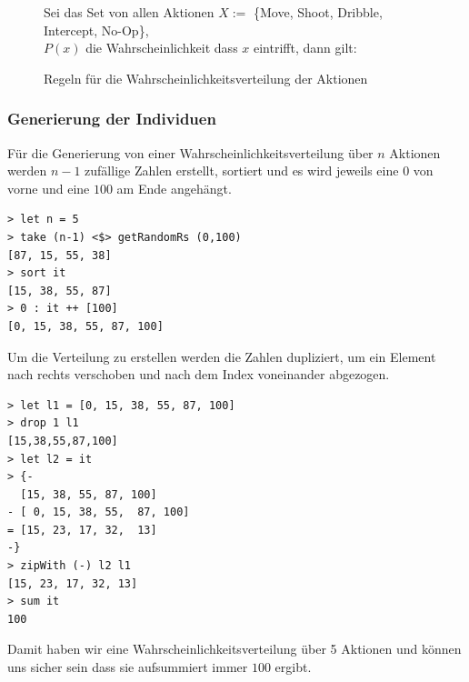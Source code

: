            \begin{figure}[H]
                \begin{mdframed}
                    Sei das Set von allen Aktionen $ X := $ \{Move, Shoot, Dribble, Intercept, No-Op\}, \\
                    $P(x)$ die Wahrscheinlichkeit dass $x$ eintrifft, dann gilt: \\[2mm]
                    \hspace*{25mm} 
                \end{mdframed}
                \renewcommand{\figurename}{Lemma}
                \caption{\label{kodierung} Regeln für die Wahrscheinlichkeitsverteilung der Aktionen}
            \end{figure}

            \subsubsection*{Generierung der Individuen}
            Für die Generierung von einer Wahrscheinlichkeitsverteilung über $n$ Aktionen werden $n-1$ zufällige Zahlen erstellt, sortiert und es wird jeweils eine $0$ von vorne und eine $100$ am Ende angehängt.

            \begin{mdframed}
            \begin{verbatim}
> let n = 5
> take (n-1) <$> getRandomRs (0,100)
[87, 15, 55, 38]
> sort it
[15, 38, 55, 87]
> 0 : it ++ [100]
[0, 15, 38, 55, 87, 100]
            \end{verbatim}
            \end{mdframed}
            \noindent
            Um die Verteilung zu erstellen werden die Zahlen dupliziert, um ein Element nach rechts verschoben und nach dem Index voneinander abgezogen.
            \begin{mdframed}
            \begin{verbatim}
> let l1 = [0, 15, 38, 55, 87, 100]
> drop 1 l1
[15,38,55,87,100]
> let l2 = it
> {-
  [15, 38, 55, 87, 100]
- [ 0, 15, 38, 55,  87, 100]
= [15, 23, 17, 32,  13]
-}
> zipWith (-) l2 l1
[15, 23, 17, 32, 13]
> sum it
100
            \end{verbatim}
            \end{mdframed}
            \noindent
            Damit haben wir eine Wahrscheinlichkeitsverteilung über 5 Aktionen und können uns sicher sein dass sie aufsummiert immer $100$ ergibt.

